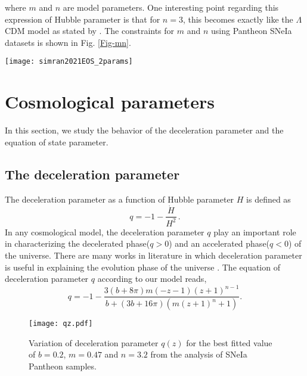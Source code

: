 where $m$ and $n$ are model parameters. One interesting point regarding this expression of Hubble parameter is that for $n = 3$, this becomes exactly like the $\Lambda$CDM model as stated by \cite{Ankan/2016}.
The constraints for $m$ and $n$ using Pantheon SNeIa datasets is shown in Fig. \ref{Fig-mn}.


\begin{figure*}[htbp]
\centering
\texttt{[image: simran2021EOS\_2params]}
\caption{The plot showing the best fit values of the model parameters $m$ and $n$ obtained with 1048 points of Pantheon datasets at $1-\sigma$ and $ 2-\sigma $ confidence level with $b=0$.} \label{Fig-mn}
\end{figure*}

\section{Cosmological parameters} \label{sec5}

In this section, we study the behavior of the deceleration parameter and the equation of state parameter. 

\subsection{The deceleration parameter}
 
The deceleration parameter as a function of Hubble parameter $H$ is defined as 
\begin{equation}
q= -1- \frac{\dot{H}}{H^{2}} \,.
\end{equation}
In any cosmological model, the deceleration parameter $q$ play an important role in characterizing the decelerated phase($q>0$) and an accelerated phase($q<0$) of the universe. There are many works in literature in which deceleration parameter is useful in explaining the evolution phase of the universe \cite{Mamon,Sahoo}.
The equation of deceleration parameter $q$ according to our model reads,
\begin{equation} \label{26}
q = -1-\frac{3 (b +8 \pi ) m (-z-1) (z+1)^{n-1}}{b +(3 b +16 \pi ) \left(m (z+1)^n+1\right)}.
\end{equation}

\begin{figure}[H]
\centering
\texttt{[image: qz.pdf]}
\caption{Variation of deceleration parameter $q(z)$ for the best fitted value of $b=0.2$,  $m=0.47$ and $n=3.2$ from the analysis of SNeIa Pantheon samples.} \label{Fig-qz}
\end{figure}


